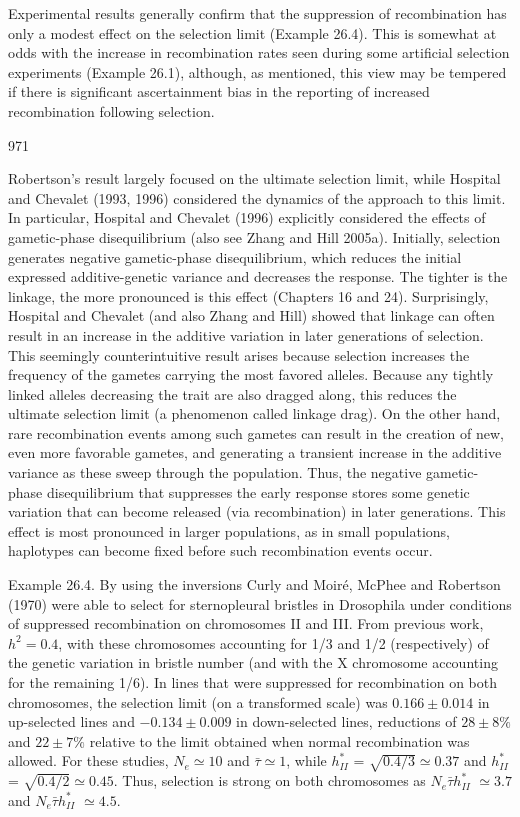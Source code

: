 \documentclass{article}
\begin{document}
{Experimental results generally confirm that the suppression of recombination has only a modest effect on the selection limit (Example 26.4). This is somewhat at odds with the increase in recombination rates seen during some artificial selection experiments (Example 26.1), although, as mentioned, this view may be tempered if there is significant ascertainment bias in the reporting of increased recombination following selection.

971

Robertson’s result largely focused on the ultimate selection limit, while Hospital and Chevalet (1993, 1996) considered the dynamics of the approach to this limit. In particular, Hospital and Chevalet (1996) explicitly considered the effects of gametic-phase disequilibrium (also see Zhang and Hill 2005a). Initially, selection generates negative gametic-phase disequilibrium, which reduces the initial expressed additive-genetic variance and decreases the response. The tighter is the linkage, the more pronounced is this effect (Chapters 16 and 24). Surprisingly, Hospital and Chevalet (and also Zhang and Hill) showed that linkage can often result in an increase in the additive variation in later generations of selection. This seemingly counterintuitive result arises because selection increases the frequency of the gametes carrying the most favored alleles. Because any tightly linked alleles decreasing the trait are also dragged along, this reduces the ultimate selection limit (a phenomenon called linkage drag). On the other hand, rare recombination events among such gametes can result in the creation of new, even more favorable gametes, and generating a transient increase in the additive variance as these sweep through the population. Thus, the negative gametic-phase disequilibrium that suppresses the early response stores some genetic variation that can become released (via recombination) in later generations. This effect is most pronounced in larger populations, as in small populations, haplotypes can become fixed before such recombination events occur.

Example 26.4. By using the inversions Curly and Moiré, McPhee and Robertson (1970) were able to select for sternopleural bristles in Drosophila under conditions of suppressed recombination on chromosomes II and III. From previous work,  $ h^2 = 0.4 $, with these chromosomes accounting for 1/3 and 1/2 (respectively) of the genetic variation in bristle number (and with the X chromosome accounting for the remaining 1/6). In lines that were suppressed for recombination on both chromosomes, the selection limit (on a transformed scale) was  $ 0.166 \pm 0.014 $ in up-selected lines and  $ -0.134 \pm 0.009 $ in down-selected lines, reductions of  $ 28 \pm 8\% $ and  $ 22 \pm 7\% $ relative to the limit obtained when normal recombination was allowed. For these studies,  $ N_e \simeq 10 $ and  $ \bar{\tau} \simeq 1 $, while  $ h_{II}^* $ =  $ \sqrt{0.4/3} \simeq 0.37 $ and  $ h_{II}^* $ =  $ \sqrt{0.4/2} \simeq 0.45 $. Thus, selection is strong on both chromosomes as  $ N_e \bar{\tau} h_{II}^* $  $ \simeq 3.7 $ and  $ N_e \bar{\tau} h_{II}^* $  $ \simeq 4.5 $.

}
\end{document}
